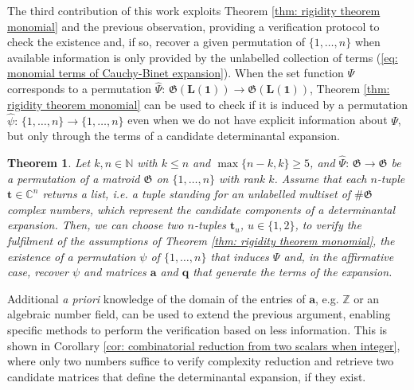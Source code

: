 \documentclass[10pt]{article}
\newtheorem{thm}{Theorem}
\theoremstyle{remark}%
\theoremstyle{definition}%
\begin{document}
The third contribution of this work exploits Theorem \ref{thm: rigidity theorem monomial} and the previous observation, providing a verification protocol to check the existence and, if so, recover a given permutation of $\{1,\dots,n\}$ when available information is only provided by the unlabelled collection of terms (\ref{eq: monomial terms of Cauchy-Binet expansion}). 
When the set function $\Psi$ corresponds to a permutation $\widehat{\Psi}:\,\mathfrak{G}(\mathbf{L}(\mathbf{1}))\longrightarrow \mathfrak{G}(\mathbf{L}(\mathbf{1}))$, Theorem \ref{thm: rigidity theorem monomial} can be used to check if it is induced by a permutation $\widehat{\psi}:\,\{1,\dots,n\}\longrightarrow\{1,\dots,n\}$ even when we do not have explicit information about $\Psi$, but only through the terms of a candidate determinantal expansion. 
\begin{thm}
\label{thm: check and recover permutation reductions} 
Let $k,n\in\mathbb{N}$ with $k\leq n$ and $\max\{n-k,k\}\geq 5$, and $\widehat{\Psi}:\,\mathfrak{G}\longrightarrow\mathfrak{G}$ be a permutation of a matroid $\mathfrak{G}$ on $\{1,\dots,n\}$ with rank $k$. 
Assume that each $n$-tuple $\mathbf{t}\in\mathbb{C}^{n}$ returns a list, i.e. a tuple standing for an unlabelled multiset of $\#\mathfrak{G}$ complex numbers, which represent the candidate components of a determinantal expansion. Then, we can choose two $n$-tuples $\mathbf{t}_{u}$, $u\in\{1,2\}$, to verify the fulfilment of the assumptions of Theorem \ref{thm: rigidity theorem monomial}, the existence of a permutation $\psi$ of $\{1,\dots,n\}$ that induces $\Psi$ and, in the affirmative case, recover $\psi$ and matrices $\mathbf{a}$ and $\mathbf{q}$ that generate the terms of the expansion. 
\end{thm}
Additional \textit{a priori} knowledge of the domain of the entries of $\mathbf{a}$, e.g. $\mathbb{Z}$ or an algebraic number field, can be used to extend the previous argument, %
enabling specific methods to perform the verification based on less information. This is shown in Corollary \ref{cor: combinatorial reduction from two scalars when integer}, where only two numbers suffice to verify complexity reduction and retrieve two candidate matrices that define the determinantal expansion, if they exist.
\end{document}
